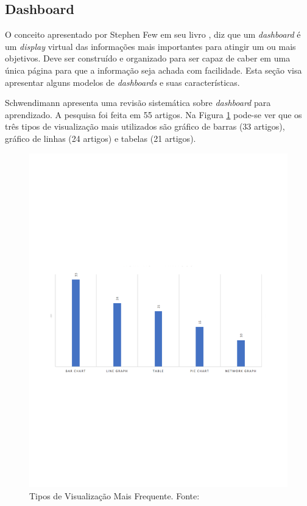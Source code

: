 \subsection{Dashboard}
O conceito apresentado por Stephen Few em seu livro \cite{book_design}, diz que um \textit{dashboard} é um \textit{display} virtual das informações mais importantes para atingir um ou mais objetivos. Deve ser construído e organizado para ser capaz de caber em uma única página para que a informação seja achada com facilidade. Esta seção visa apresentar alguns modelos de \textit{dashboards} e suas características.

Schwendimann \cite{schwendimann_perceiving_2016} apresenta uma revisão sistemática sobre \textit{dashboard} para aprendizado. A pesquisa foi feita em 55 artigos. Na Figura \ref{img:tipo_visualizacao} pode-se ver que os três tipos de visualização mais utilizados são gráfico de barras (33 artigos), gráfico de linhas (24 artigos) e tabelas (21 artigos).
\graphicspath{{figuras/}}
\begin{figure}[h!]
\centering
\includegraphics[scale=0.60]{grafico_pesquisa}
\caption{Tipos de Visualização Mais Frequente. Fonte: \cite{schwendimann_perceiving_2016}}
\label{img:tipo_visualizacao}
\end{figure}

